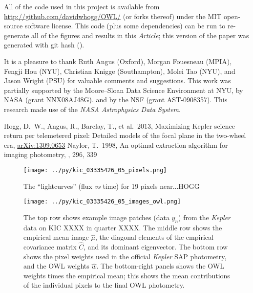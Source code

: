\documentclass[12pt, letterpaper, preprint]{aastex}
\newcommand{\documentname}{\textsl{Article}}
\newcommand{\project}[1]{\textsl{#1}}
\newcommand{\foreign}[1]{\textsl{#1}}
\newcommand{\etal}{\foreign{et\,al.}}
\begin{document}
All of the code used in this project is available
  from \url{http://github.com/davidwhogg/OWL/} (or forks thereof)
  under the MIT open-source software license.
This code (plus some dependencies) can be run
  to re-generate all of the figures and results in this \documentname;
  this version of the paper was generated with git hash
  \texttt{\githash} (\gitdate).

\acknowledgments
It is a pleasure to thank
  Ruth Angus (Oxford),
  Morgan Fouesneau (MPIA),
  Fengji Hou (NYU), 
  Christian Knigge (Southampton),
  Molei Tao (NYU), and
  Jason Wright (PSU)
for valuable comments and suggestions.
This work was partially supported by the Moore--Sloan Data Science Environment at NYU,
  by NASA (grant NNX08AJ48G).
  and by the NSF (grant AST-0908357).
This research made use of the \project{NASA Astrophysics Data System}.

\newcommand{\arxiv}[1]{\href{http://arxiv.org/abs/#1}{arXiv:#1}}
\begin{thebibliography}{}\raggedright
\bibitem[Hogg \etal(2013)]{hoggwhitepaper}
Hogg, D.~W., Angus, R., Barclay, T., et al.\ 2013,
Maximizing Kepler science return per telemetered pixel: Detailed models of the focal plane in the two-wheel era,
\arxiv{1309.0653}
Naylor, T.\ 1998,
An optimal extraction algorithm for imaging photometry,
\mnras, 296, 339
\end{thebibliography}

\clearpage
\begin{figure}
\texttt{[image: ../py/kic\_03335426\_05\_pixels.png]}
\caption{
The ``lightcurves'' (flux \foreign{vs} time) for 19 pixels near...HOGG
\label{fig:pixels}}
\end{figure}

\clearpage
\begin{figure}
\texttt{[image: ../py/kic\_03335426\_05\_images\_owl.png]}
\caption{
The top row shows example image patches (data $y_n$) from the \project{Kepler} data on KIC XXXX in quarter XXXX.
The middle row shows the empirical mean image $\hat{\mu}$,
  the diagonal elements of the empirical covariance matrix $\hat{C}$,
  and its dominant eigenvector.
The bottom row shows the pixel weights used in the official \project{Kepler} SAP photometry,
  and the OWL weights $\hat{w}$.
The bottom-right panels shows the OWL weights times the empirical mean;
  this shows the mean contributions of the individual pixels to the final OWL photometry.
\label{fig:images}}
\end{figure}
\end{document}

